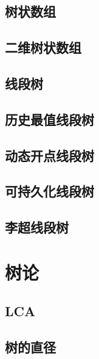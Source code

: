 \documentclass[twocolumn,a4]{article}  %
\begin{document}
	 	\subsection{树状数组}
	 	 	
	 	 	
	 	\subsection{二维树状数组}
	 	 	
	 	 	
	 	\subsection{线段树}
	 	 	
	 	 	
		\subsection{历史最值线段树}
	 	 	
	 	 	
	 	\subsection{动态开点线段树}
	 	 	
	 	 	
		\subsection{可持久化线段树}
	 	 	
	 	 	
		\subsection{李超线段树}
			
	 	 	
	\section{树论}
		\subsection{LCA}
	 	 	
	 	 	
		\subsection{树的直径}
	 	 	
	 	 	
\end{document}
